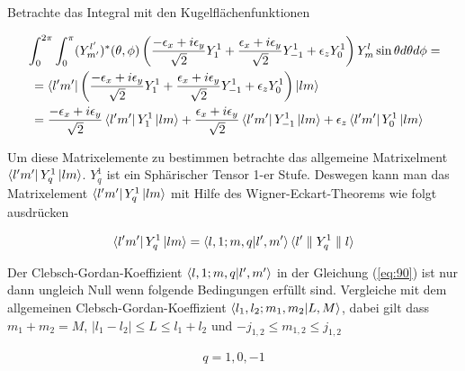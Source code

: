 Betrachte das Integral mit den Kugelflächenfunktionen

\begin{align}
  \label{eq:89}
  &\int_0^{2\pi} \int_0^\pi (Y^{l'}_{m'})^*(\theta,\phi) \left(  \frac{-\epsilon_x+i\epsilon_y}{\sqrt{2}}Y^1_1  + \frac{\epsilon_x+i\epsilon_y}{\sqrt{2}}Y^1_{-1} + \epsilon_z Y^1_0   \right) Y^{l}_{m} \sin\theta d\theta d\phi = \notag \\
&\,\,= \left\langle l'm' \right|\left(  \frac{-\epsilon_x+i\epsilon_y}{\sqrt{2}}Y^1_1  + \frac{\epsilon_x+i\epsilon_y}{\sqrt{2}}Y^1_{-1} + \epsilon_z Y^1_0   \right)\left| lm \right\rangle \notag \\
&\,\,=  \frac{-\epsilon_x+i\epsilon_y}{\sqrt{2}} \left\langle l'm' \right| Y^1_1\left| lm \right\rangle  + \frac{\epsilon_x+i\epsilon_y}{\sqrt{2}}\left\langle l'm' \right| Y^1_{-1}\left| lm \right\rangle + \epsilon_z \left\langle l'm' \right| Y^1_0 \left| lm \right\rangle \notag \\
\end{align}

Um diese Matrixelemente zu bestimmen betrachte das allgemeine Matrixelment \(\left\langle l'm' \right| Y^1_{q}\left| lm \right\rangle\). \(Y^1_{q}\) ist ein Sphärischer Tensor 1-er Stufe. Deswegen kann man das Matrixelement \(\left\langle l'm' \right| Y^1_{q}\left| lm \right\rangle\) mit Hilfe des Wigner-Eckart-Theorems wie folgt ausdrücken

\begin{align}
  \label{eq:90}
  \bra{l'm'} Y^1_{q}\ket{lm} = \braket{ l,1;m,q }{l',m'} \langle l' \parallel Y^1_{q} \parallel l \rangle
\end{align}

Der Clebsch-Gordan-Koeffizient \( \braket{ l,1;m,q }{l',m'} \) in der Gleichung (\ref{eq:90}) ist nur dann ungleich Null wenn folgende Bedingungen erfüllt sind. Vergleiche mit dem allgemeinen  Clebsch-Gordan-Koeffizient \( \braket{ l_1,l_2;m_1,m_2 }{L,M} \), dabei gilt dass \(m_1+m_2=M\), \(|l_1-l_2|\le L \le l_1+l_2\) und \(-j_{1,2}\le m_{1,2} \le j_{1,2}\)

\begin{align}
  \label{eq:91}
    q = 1,0,-1
\end{align}





